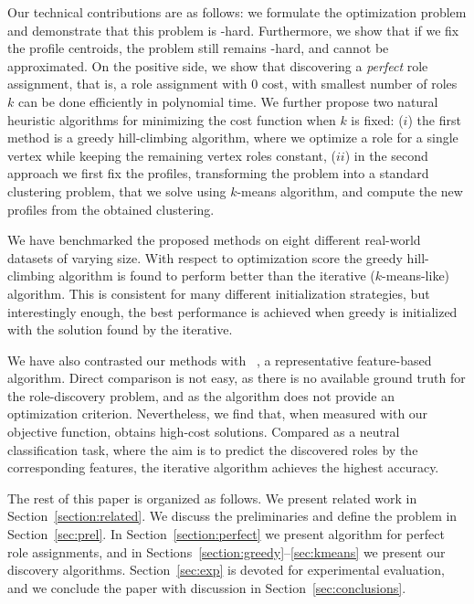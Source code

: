 Our technical contributions are as follows: we formulate the optimization
problem and demonstrate that this problem is \np-hard. Furthermore, we show
that if we fix the profile centroids, 
the problem still remains \np-hard, and 
cannot be approximated.
On the positive side, we show that discovering a \emph{perfect}
role assignment, that is, a role assignment with $0$ cost, with smallest number
of roles $k$ can be done efficiently in polynomial time. We further propose two
natural heuristic algorithms for minimizing the cost function when $k$ is fixed: 
($i$) the first method is
a greedy hill-climbing algorithm, where we optimize a role for a single
vertex while keeping the remaining vertex roles constant,
($ii$) in the second approach we first fix the profiles, transforming
the problem into a standard clustering problem, that we solve using $k$-means algorithm,
and compute the new profiles from the obtained clustering.

We have benchmarked the proposed methods
on eight different real-world datasets of varying size.
With respect to optimization score
the greedy hill-climbing algorithm is found to perform better 
than the iterative ($k$-means-like) algorithm.
This is consistent for many different initialization strategies, 
but interestingly enough, 
the best performance is achieved when greedy is initialized with the solution found by the iterative.

We have also contrasted our methods with
\algrolx~\cite{henderson2012rolx}, 
a representative feature-based algorithm.
Direct comparison is not easy, 
as there is no available ground truth for the role-discovery problem, 
and as the \algrolx algorithm does not provide an optimization criterion.
Nevertheless, we find that, when measured with our objective function, 
\algrolx obtains high-cost solutions.
Compared as a neutral classification task,
where the aim is to predict the discovered roles by the corresponding features, 
the iterative algorithm achieves the highest accuracy.

The rest of this paper is organized as follows.
We present related work in Section~\ref{section:related}.
We discuss the preliminaries and define the problem in Section~\ref{sec:prel}.
In Section~\ref{section:perfect} we present algorithm for perfect role assignments,
and in Sections~\ref{section:greedy}--\ref{sec:kmeans} we present our discovery algorithms.
Section~\ref{sec:exp} is devoted for experimental evaluation, and we conclude the paper with discussion in Section~\ref{sec:conclusions}.







